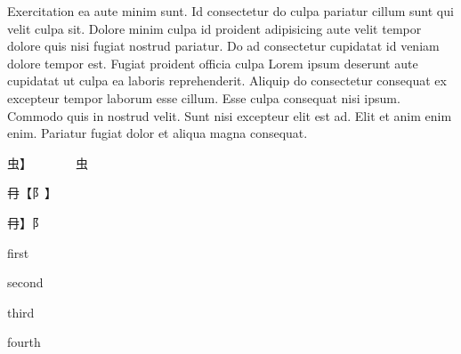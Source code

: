
Exercitation ea aute minim sunt. Id consectetur do culpa pariatur cillum sunt qui velit culpa sit. Dolore minim culpa id proident adipisicing aute velit tempor dolore quis nisi fugiat nostrud pariatur. Do ad consectetur cupidatat id veniam dolore tempor est. Fugiat proident officia culpa Lorem ipsum deserunt aute cupidatat ut culpa ea laboris reprehenderit. Aliquip do consectetur consequat ex excepteur tempor laborum esse cillum. Esse culpa consequat nisi ipsum. Commodo quis in nostrud velit. Sunt nisi excepteur elit est ad. Elit et anim enim enim. Pariatur fugiat dolor et aliqua magna consequat.



{\mktsTightParagraphs{}

\null\par
\null\par
\null\par
\null\par
\null\par
{虫{\mktsFontfileNanummyeongjo{}】}{\cnsym{}　}{\cnsym{}　}{\cnsym{}　}{\cnsym{}　}虫}\par
\null\par
\null\par
\null\par
\null\par
{\cjk{}{\cnsym{}　}{\cnsym{}　}冄{\mktsFontfileNanummyeongjo{}【}{阝}{\mktsFontfileNanummyeongjo{}】}{\cnsym{}　}{\cnsym{}　}{\cnsym{}　}{\cnsym{}　}{\cnxb{}𨙻}}\par
{冄{\mktsFontfileNanummyeongjo{}】}{阝}{\cnsym{}　}{\cnsym{}　}{\cnsym{}　}{\cnxb{}𨙻}}\par
\null\par
}

{\mktsTightParagraphs{}

\null\par
first\par
second\par
\null\par
\null\par
third\par
\null\par
\null\par
\null\par
\null\par
fourth\par
\null\par
\null\par
\null\par
}

